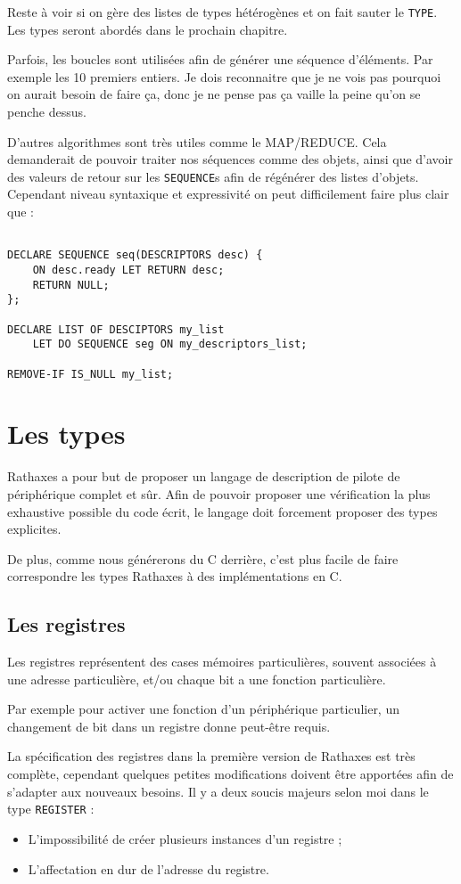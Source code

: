 \documentclass[french]{rtxreport}
\begin{document}
Reste à voir si on gère des listes de types hétérogènes et on fait sauter le \texttt{TYPE}. Les types seront abordés dans le prochain chapitre.

Parfois, les boucles sont utilisées afin de générer une séquence d’éléments. Par exemple les 10 premiers entiers. Je dois reconnaitre que je ne vois pas pourquoi on aurait besoin de faire ça, donc je ne pense pas ça vaille la peine qu’on se penche dessus.

D’autres algorithmes sont très utiles comme le MAP/REDUCE. Cela demanderait de pouvoir traiter nos séquences comme des objets, ainsi que d’avoir des valeurs de retour sur les \texttt{SEQUENCE}s afin de régénérer des listes d’objets. Cependant niveau syntaxique et expressivité on peut difficilement faire plus clair que :
\begin{lstlisting}

DECLARE SEQUENCE seq(DESCRIPTORS desc) {
	ON desc.ready LET RETURN desc;
	RETURN NULL;
};

DECLARE LIST OF DESCIPTORS my_list
	LET DO SEQUENCE seg ON my_descriptors_list;

REMOVE-IF IS_NULL my_list;

\end{lstlisting}

\chapter{Les types}

Rathaxes a pour but de proposer un langage de description de pilote de périphérique complet et sûr. Afin de pouvoir proposer une vérification la plus exhaustive possible du code écrit, le langage doit forcement proposer des types explicites.

De plus, comme nous générerons du C derrière, c’est plus facile de faire correspondre les types Rathaxes à des implémentations en C.

\section{Les registres}

Les registres représentent des cases mémoires particulières, souvent associées à une adresse particulière, et/ou chaque bit a une fonction particulière.

Par exemple pour activer une fonction d’un périphérique particulier, un changement de bit dans un registre donne peut-être requis.

La spécification des registres dans la première version de Rathaxes est très complète, cependant quelques petites modifications doivent être apportées afin de s’adapter aux nouveaux besoins.
Il y a deux soucis majeurs selon moi dans le type \texttt{REGISTER} : 
\begin{itemize}
	\item L’impossibilité de créer plusieurs instances d’un registre ; 
	\item L’affectation en dur de l’adresse du registre. 
\end{itemize}
\end{document}
